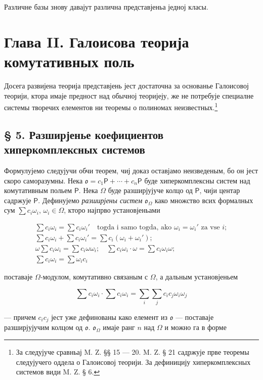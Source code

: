 \documentclass[11pt]{article}
\newcommand{\srcfn}[2]{\footnote{#2}}
\begin{document}
Различне базы знову давајут различна представјеньа једној класы.

\section*{Глава II. Галоисова теорија комутативных поль}\label{kapitel-ii.-galoissche-theorie-kommutativer-koerper}

Досега развијена теорија представјень јест достаточна за основанье Галоисовој теорији, ктора имаје предност над обычној теоријеју, же не потребује специалне системы творечих елементов ни теоремы о полиномах неизвестных.\srcfn{1}{За следујуче сравньај M. Z. §§ 15 --- 20. M. Z. § 21 садржује прве теоремы следујучего оддела о Галоисовој теорији. За дефиницију хиперкомплексных системов види M. Z. § 6.}

\subsection*{§ 5. Разширјенье коефициентов хиперкомплексных системов}\label{koeffizientenerweiterung-hyperkomplexer-systeme}

Формулујемо следујучи обчи теорем, чиј доказ оставјамо неизведеным, бо он јест скоро саморазумны. Нека \(\mathfrak{o}=c_1\mathsf P+\cdots+c_n\mathsf P\) буде хиперкомплексны систем над комутативным польем \(\mathsf P\). Нека \(\Omega\) буде разширјујуче колцо од \(\mathsf P\), чији центар садржује \(\mathsf P\). Дефинујемо \emph{разширјены систем} \(\mathfrak{o}_{\Omega}\) како множство всих формалных сум \(\sum c_i\omega_i\), \(\omega_i\in\Omega\), кторо најпрво установјеньами

\[
\begin{array}{l}
\sum c_i\omega_i=\sum c_i\omega_i' \quad\text{togda i samo togda, ako } \omega_i=\omega_i' \text{ za vse } i;\\
\sum c_i\omega_i+\sum c_i\omega_i'=\sum c_i(\omega_i+\omega_i');\\
\omega\sum c_i\omega_i=\sum c_i\omega\omega_i;\quad
\sum c_i\omega_i\cdot\omega=\sum c_i\omega_i\omega;\\
\sum c_i\omega_i=\sum \omega_i c_i
\end{array}
\]

поставаје \(\Omega\)-модулом, комутативно связаным с \(\Omega\), а дальным установјеньем

\[
\sum c_i\omega_i\cdot \sum c_i\omega_i
=\sum_i\sum_j c_ic_j\omega_i\omega_j
\]

--- причем \(c_ic_j\) јест уже дефинованы како елемент из \(\mathfrak{o}\) --- поставаје разширјујучим колцом од \(\mathfrak{o}\). \(\mathfrak{o}_{\Omega}\) имаје ранг \(n\) над \(\Omega\) и можно га в форме
\end{document}
